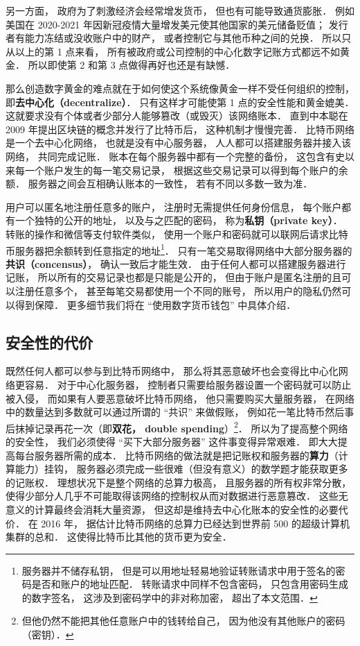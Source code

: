 另一方面， 政府为了刺激经济会经常增发货币， 但也有可能导致通货膨胀． 例如美国在 2020-2021 年因新冠疫情大量增发美元使其他国家的美元储备贬值； 发行者有能力冻结或没收账户中的财产， 或者控制它与其他币种之间的兑换． 所以只从以上的第 1 点来看， 所有被政府或公司控制的中心化数字记账方式都远不如黄金． 所以即使第 2 和第 3 点做得再好也还是有缺憾．

那么创造数字黄金的难点就在于如何使这个系统像黄金一样不受任何组织的控制， 即\textbf{去中心化（decentralize）}． 只有这样才可能使第 1 点的安全性能和黄金媲美． 这就要求没有个体或者少部分人能够篡改（或毁灭）该网络账本． 直到中本聪在 2009 年提出区块链的概念并发行了比特币后， 这种机制才慢慢完善． 比特币网络是一个去中心化网络， 也就是没有中心服务器， 人人都可以搭建服务器并接入该网络， 共同完成记账． 账本在每个服务器中都有一个完整的备份， 这包含有史以来每一个账户发生的每一笔交易记录， 根据这些交易记录可以得到每个账户的余额． 服务器之间会互相确认账本的一致性， 若有不同以多数一致为准．

用户可以匿名地注册任意多的账户， 注册时无需提供任何身份信息， 每个账户都有一个独特的公开的地址， 以及与之匹配的密码， 称为\textbf{私钥（private key）}． 转账的操作和微信等支付软件类似， 使用一个账户和密码就可以联网后请求比特币服务器把余额转到任意指定的地址\footnote{服务器并不储存私钥， 但是可以用地址轻易地验证转账请求中用于签名的密码是否和账户的地址匹配． 转账请求中同样不包含密码， 只包含用密码生成的数字签名， 这涉及到密码学中的非对称加密， 超出了本文范围．}． 只有一笔交易取得网络中大部分服务器的\textbf{共识（concensus）}， 确认一致后才能生效． 由于任何人都可以搭建服务器进行记账， 所以所有的交易记录也都是只能是公开的， 但由于账户是匿名注册的且可以注册任意多个， 甚至每笔交易都使用一个不同的账号， 所以用户的隐私仍然可以得到保障． 更多细节我们将在 “使用数字货币钱包” 中具体介绍．


\subsection{安全性的代价}
既然任何人都可以参与到比特币网络中， 那么将其恶意破坏也会变得比中心化网络更容易． 对于中心化服务器， 控制者只需要给服务器设置一个密码就可以防止被入侵， 而如果有人要恶意破坏比特币网络， 他只需要购买大量服务器， 在网络中的数量达到多数就可以通过所谓的 “共识” 来做假账， 例如花一笔比特币然后事后抹掉记录再花一次（即\textbf{双花， double spending}）\footnote{但他仍然不能把其他任意账户中的钱转给自己， 因为他没有其他账户的密码（密钥）．}． 所以为了提高整个网络的安全性， 我们必须使得 “买下大部分服务器” 这件事变得异常艰难． 即大大提高每台服务器所需的成本． 比特币网络的做法就是把记账权和服务器的\textbf{算力}（计算能力）挂钩， 服务器必须完成一些很难（但没有意义）的数学题才能获取更多的记账权． 理想状况下是整个网络的总算力极高， 且服务器的所有权非常分散， 使得少部分人几乎不可能取得该网络的控制权从而对数据进行恶意篡改． 这些无意义的计算最终会消耗大量资源， 但这却是维持去中心化账本的安全性的必要代价． 在 2016 年， 据估计比特币网络的总算力已经达到世界前 500 的超级计算机集群的总和． 这使得比特币比其他的货币更为安全．

